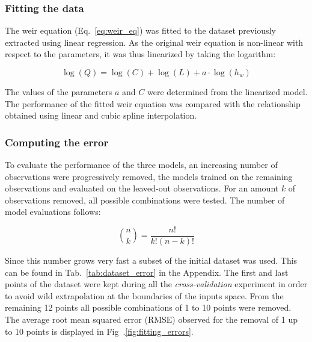 \subsubsection{Fitting the data}
The weir equation (Eq.~\ref{eq:weir_eq}) was fitted to the dataset previously extracted using linear regression.
As the original weir equation is non-linear with respect to the parameters, it was thus linearized by taking the logarithm:

\begin{equation}
  \log(Q) = \log(C) + \log(L) + a \cdot \log(h_w)
\end{equation}

\noindent The values of the parameters $a$ and $C$ were determined from the linearized model.
The performance of the fitted weir equation was compared with the relationship obtained using linear and cubic spline interpolation.

\subsubsection{Computing the error}\label{sec:compute_error}
To evaluate the performance of the three models, an increasing number of observations were progressively removed, the models trained on the remaining observations and evaluated on the leaved-out observations.
For an amount $k$ of observations removed, all possible combinations were tested. The number of model evaluations follows:

\begin{equation}
  \binom{n}{k} = \frac{n!}{k!\left(n-k\right)!}
\end{equation}

\noindent Since this number grows very fast a subset of the initial dataset was used.
This can be found in Tab.~\ref{tab:dataset_error} in the Appendix.
The first and last points of the dataset were kept during all the \emph{cross-validation} experiment in order to avoid wild extrapolation at the boundaries of the inputs space.
From the remaining \num{12} points all possible combinations of \num{1} to \num{10} points were removed.
The average root mean squared error (RMSE) observed for the removal of \num{1} up to \num{10} points is displayed in Fig~.\ref{fig:fitting_errors}.

